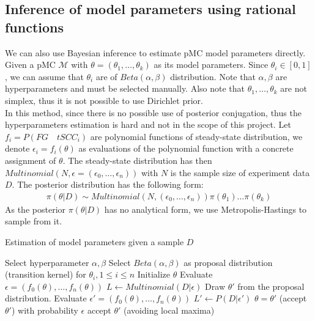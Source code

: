 \documentclass[12pt]{article}
\theoremstyle{definition}
\begin{document}
\subsection{Inference of model parameters using rational functions}
We can also use Bayesian inference to estimate pMC model parameters directly.
Given a pMC $\mathcal{M}$ with $\theta=(\theta_1,\ldots,\theta_k)$ as its model
parameters. Since $\theta_i \in [0,1]$, we can assume that $\theta_i$ are of
$Beta(\alpha, \beta)$ distribution. Note that $\alpha, \beta$ are
hyperparameters and must be selected manually. Also note that
$\theta_1,\ldots,\theta_k$ are not simplex, thus it is not possible to use
Dirichlet prior. \\
In this method, since there is no possible use of posterior conjugation, thus
the hyperparameters estimation is hard and not in the scope of this project. Let
$f_i = P (FG\quad tSCC_i)$ are polynomial functions of steady-state
distribution, we denote $\epsilon_i = f_i(\theta)$ as evaluations of the
polynomial function with a concrete assignment of $\theta$. The steady-state
distribution has then $Multinomial(N, \epsilon = (\epsilon_0,\ldots,\epsilon_n))$ with $N$
is the sample size of experiment data $D$. The posterior distribution has the
following form:
\begin{align*}
  \pi(\theta|D) \sim Multinomial(N, (\epsilon_0,\ldots,\epsilon_n))\pi(\theta_1)\ldots\pi(\theta_k)
\end{align*}
As the posterior $\pi(\theta|D)$ has no analytical form, we use
Metropolis-Hastings to sample from it.
\begin{algorithm}[H]
  \caption{Estimation of model parameters given a sample $D$}\label{exp_b}
  \begin{algorithmic}[1]
    \State Select hyperparameter $\alpha, \beta$
    \State Select $Beta(\alpha, \beta)$ as proposal distribution (transition
    kernel) for $\theta_i, 1\leq i \leq n$
    \State Initialize $\theta$
    \State Evaluate $\epsilon = (f_0(\theta),\ldots,f_n(\theta))$
    \State $L \leftarrow Multinomial(D|\epsilon)$
    \State Draw $\theta'$ from the proposal distribution.
    \State Evaluate $\epsilon' = (f_0(\theta),\ldots,f_n(\theta))$
    \State $L' \leftarrow P(D|\epsilon')$
    \State  $\theta = \theta'$ (accept $\theta'$)
    \Else
    \State with probability $\epsilon$ accept $\theta'$ (avoiding local maxima)
    \EndIf
    \EndWhile
    \EndProcedure
  \end{algorithmic}
\end{algorithm}
\end{document}
